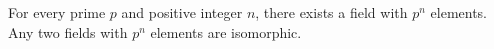 For every prime $p$ and positive integer $n$, there exists a field with $p^n$ elements. Any two fields with $p^n$ elements are isomorphic.
